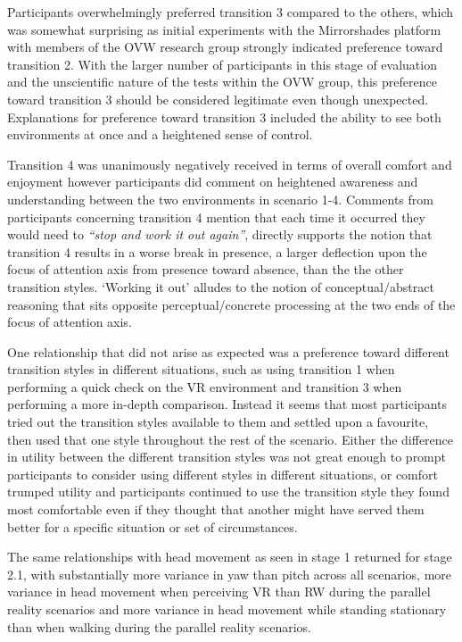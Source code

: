 Participants overwhelmingly preferred transition 3 compared to the others, which was somewhat surprising as initial experiments with the Mirrorshades platform with members of the OVW research group strongly indicated preference toward transition 2. With the larger number of participants in this stage of evaluation and the unscientific nature of the tests within the OVW group, this preference toward transition 3 should be considered legitimate even though unexpected. Explanations for preference toward transition 3 included the ability to see both environments at once and a heightened sense of control.

Transition 4 was unanimously negatively received in terms of overall comfort and enjoyment however participants did comment on heightened awareness and understanding between the two environments in scenario 1-4. Comments from participants concerning transition 4 mention that each time it occurred they would need to \textit{``stop and work it out again''}, directly supports the notion that transition 4 results in a worse break in presence, a larger deflection upon the focus of attention axis from presence toward absence, than the the other transition styles. `Working it out' alludes to the notion of conceptual/abstract reasoning that sits opposite perceptual/concrete processing at the two ends of the focus of attention axis.

One relationship that did not arise as expected was a preference toward different transition styles in different situations, such as using transition 1 when performing a quick check on the VR environment and transition 3 when performing a more in-depth comparison. Instead it seems that most participants tried out the transition styles available to them and settled upon a favourite, then used that one style throughout the rest of the scenario. Either the difference in utility between the different transition styles was not great enough to prompt participants to consider using different styles in different situations, or comfort trumped utility and participants continued to use the transition style they found most comfortable even if they thought that another might have served them better for a specific situation or set of circumstances.

The same relationships with head movement as seen in stage 1 returned for stage 2.1, with substantially more variance in yaw than pitch across all scenarios, more variance in head movement when perceiving VR than RW during the parallel reality scenarios and more variance in head movement while standing stationary than when walking during the parallel reality scenarios.

